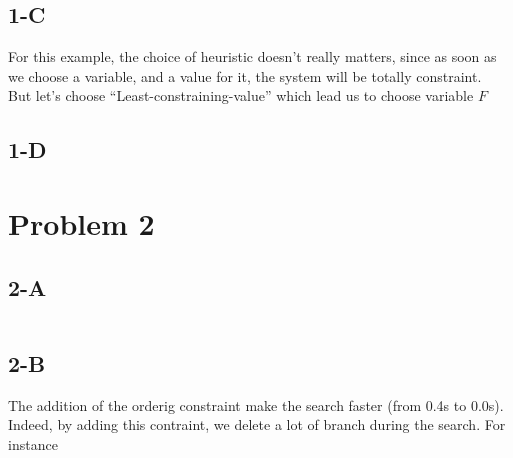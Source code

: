 \documentclass{article}
\begin{document}
        \subsection{1-C}
            For this example, the choice of heuristic doesn't really matters, since as soon as we choose a variable, and a value for it, the system will be totally constraint.\\
            But let's choose ``Least-constraining-value'' which lead us to choose variable $F$
        \subsection{1-D}
    \section{Problem 2}
        \subsection{2-A}
            \inputminted{python}{square.py}
        \subsection{2-B}
            The addition of the orderig constraint make the search faster (from 0.4s to 0.0s).\\
            Indeed, by adding this contraint, we delete a lot of branch during the search. For instance
\end{document}
